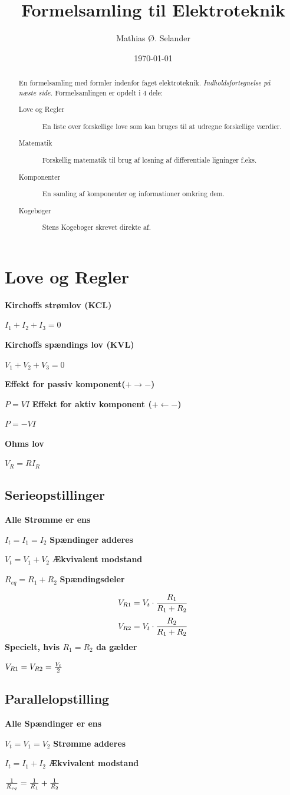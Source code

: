 \documentclass[12pt]{article}
\newcommand{\lov}[2]{{\bf #1}\par\nobreak #2\vskip 5pt}
\begin{document}
\title{Formelsamling til Elektroteknik}
\author{Mathias \O. Selander}
\date{\today}
\maketitle

\begin{abstract}
    En formelsamling med formler indenfor faget elektroteknik. \emph{Indholdsfortegnelse på næste side.}
    \vskip 10pt
    Formelsamlingen er opdelt i 4 dele:
    \begin{description}
	\item[Love og Regler] En liste over forskellige love som kan bruges til at udregne forskellige værdier.
	\item[Matematik] Forskellig matematik til brug af løsning af differentiale ligninger f.eks.
	\item[Komponenter] En samling af komponenter og informationer omkring dem.
	\item[Kogebøger] Stens Kogebøger skrevet direkte af.
    \end{description}
\end{abstract}
\pagebreak

\tableofcontents
\pagebreak

\section{Love og Regler}
\lov{Kirchoffs str\o mlov (KCL)}{$I_1+I_2+I_3=0$}

\lov{Kirchoffs sp\ae ndings lov (KVL)}{$V_1+V_2+V_3=0$}

\lov{Effekt for passiv komponent($+\rightarrow -$)}{$P=VI$}
\lov{Effekt for aktiv komponent ($+\leftarrow -$)}{$P=-VI$}

\lov{Ohms lov}{$V_R=RI_R$}

\subsection{Serieopstillinger}
\lov{Alle Strømme er ens}{$I_t=I_1=I_2$}
\lov{Spændinger adderes}{$V_t=V_1+V_2$}
\lov{Ækvivalent modstand}{$R_{eq}=R_1+R_2$}
\lov{Spændingsdeler}{$$V_{R1}=V_t\cdot{R_1\over R_1+R_2}$$ $$V_{R2}=V_t\cdot{R_2\over R_1+R_2}$$}
\lov{Specielt, hvis $R_1=R_2$ da gælder}{$V_{R1}=V_{R2}={V_t\over 2}$}

\subsection{Parallelopstilling}
\lov{Alle Spændinger er ens}{$V_t=V_1=V_2$}
\lov{Strømme adderes}{$I_t=I_1+I_2$}
\lov{Ækvivalent modstand}{${1\over R_{eq}}={1\over R_1}+{1\over R_2}$}
\end{document}
